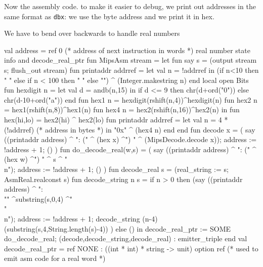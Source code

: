 \endcode
{}
Now the assembly code.
to make it easier to debug, we print out addresses in the same format
as {\tt dbx}: we use the byte address and we print it in hex.

We have to bend over backwards to handle real numbers

\enddocs
{}
\endmoddef
val address = ref 0             (* address of next instruction in words *)
\LA{}real number state info and \code{}decode_real_ptr\edoc{}\RA{}
fun MipsAsm stream =
    let fun say s = (output stream s; flush_out stream)
        fun printaddr addrref = 
           let val n = !addrref
           in  (if n<10 then "  " else if n < 100 then " " else "") 
                ^ (Integer.makestring n) 
           end
        local 
            open Bits
            fun hexdigit n = 
                let val d = andb(n,15)
                in  if d <= 9 then chr(d+ord("0"))
                              else chr(d-10+ord("a"))
                end
            fun hex1 n = hexdigit(rshift(n,4))^hexdigit(n)
            fun hex2 n = hex1(rshift(n,8))^hex1(n)
            fun hex4 n = hex2(rshift(n,16))^hex2(n)
        in
            fun hex(hi,lo) = hex2(hi) ^ hex2(lo)
            fun printaddr addrref = 
                let val n = 4 * (!addrref)      (* address in bytes *)
                in "0x" ^ (hex4 n) 
           end
        end
        fun decode x = (
                say ((printaddr address) ^ ": (" ^ (hex x) ^") " 
                 ^ (MipsDecode.decode x));
           address := !address + 1; ()
           )
        fun do_decode_real(w,s) = (
                say ((printaddr address) ^ ": (" ^ (hex w) ^") " 
                 ^ s ^ "\\n");
           address := !address + 1; ()
           )
        fun decode_real s = (real_string := s; AsmReal.realconst s)
        fun decode_string n s =
            if n > 0 then
                (say ((printaddr address) 
                            ^ ": \\"" ^substring(s,0,4) ^"\\"\\n");
                   address := !address + 1;
                   decode_string (n-4) (substring(s,4,String.length(s)-4))
                   )
            else ()
    in
        decode_real_ptr := SOME do_decode_real;
        (decode,decode_string,decode_real) : emitter_triple
    end
\endcode
{}
\endmoddef
val decode_real_ptr = ref NONE : ((int * int) * string -> unit) option ref
                                   (* used to emit asm code for a real word *)
    

